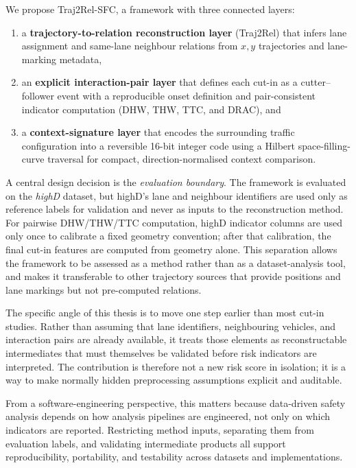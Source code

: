 \documentclass[12pt,a4paper,twoside,openright]{report}
\newcommand{\FrameworkName}{Traj2Rel-SFC}
\begin{document}
    We propose \FrameworkName{}, a framework with three connected layers:

    \begin{enumerate}[leftmargin=1.6em]
  \item a \textbf{trajectory-to-relation reconstruction layer} (Traj2Rel) that infers lane assignment and same-lane neighbour relations from $x,y$ trajectories and lane-marking metadata,
  \item an \textbf{explicit interaction-pair layer} that defines each cut-in as a cutter--follower event with a reproducible onset definition and pair-consistent indicator computation (DHW, THW, TTC, and DRAC), and
  \item a \textbf{context-signature layer} that encodes the surrounding traffic configuration into a reversible 16-bit integer code using a Hilbert space-filling-curve traversal for compact, direction-normalised context comparison.
    \end{enumerate}

    A central design decision is the \emph{evaluation boundary}. The framework is evaluated on the \textit{highD} dataset, but highD's lane and neighbour identifiers are used only as reference labels for validation and never as inputs to the reconstruction method. For pairwise DHW/THW/TTC computation, highD indicator columns are used only once to calibrate a fixed geometry convention; after that calibration, the final cut-in features are computed from geometry alone. This separation allows the framework to be assessed as a method rather than as a dataset-analysis tool, and makes it transferable to other trajectory sources that provide positions and lane markings but not pre-computed relations.

    The specific angle of this thesis is to move one step earlier than most cut-in studies. Rather than assuming that lane identifiers, neighbouring vehicles, and interaction pairs are already available, it treats those elements as reconstructable intermediates that must themselves be validated before risk indicators are interpreted. The contribution is therefore not a new risk score in isolation; it is a way to make normally hidden preprocessing assumptions explicit and auditable.

    From a software-engineering perspective, this matters because data-driven safety analysis depends on how analysis pipelines are engineered, not only on which indicators are reported. Restricting method inputs, separating them from evaluation labels, and validating intermediate products all support reproducibility, portability, and testability across datasets and implementations.
\end{document}
